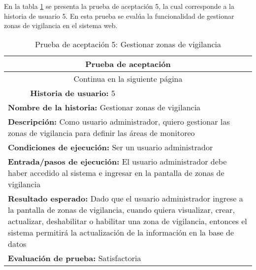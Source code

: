 En la tabla \ref{tab:prueba-5} se presenta la prueba de aceptación 5, la cual corresponde a la historia de usuario 5.
En esta prueba se evalúa la funcionalidad de gestionar zonas de vigilancia en el sistema web.

\begin{longtable}{|p{6.7cm}|p{6.7cm}|}
    \caption{Prueba de aceptación 5: Gestionar zonas de vigilancia} \label{tab:prueba-5}
    \\
    \hline
    \multicolumn{2}{|c|}{\textbf{Prueba de aceptación}}                                                                                                                         \\
    \hline

    \endfirsthead

    \hline
    \endhead

    \hline
    \multicolumn{2}{|c|}{{Continua en la siguiente página}}                                                                                                                     \\
    \hline
    \endfoot

    \hline
    \endlastfoot
    \multicolumn{1}{|p{6.7cm}|}{\textbf{Número} 5 } & \multicolumn{1}{|p{6.7cm}|}{\textbf{Historia de usuario:} 5}                                                              \\
    \hline
    \multicolumn{2}{|p{13.4cm}|}{\textbf{Nombre de la historia:} Gestionar zonas de vigilancia }                                                                                \\
    \hline
    \multicolumn{2}{|p{13.4cm}|}{\textbf{Descripción:} Como usuario administrador, quiero gestionar las zonas de vigilancia para definir las áreas de monitoreo}                \\
    \hline
    \multicolumn{2}{|p{13.4cm}|}{\textbf{Condiciones de ejecución:} Ser un usuario administrador}                                                                               \\
    \hline
    \multicolumn{2}{|p{13.4cm}|}{\textbf{Entrada/pasos de ejecución:} El usuario administrador debe haber accedido al sistema e ingresar en la pantalla de zonas de vigilancia} \\
    \hline
    \multicolumn{2}{|p{13.4cm}|}{\textbf{Resultado esperado:} Dado que el usuario administrador ingrese a la pantalla de zonas de vigilancia, cuando quiera visualizar, crear,
    actualizar, deshabilitar o habilitar una zona de vigilancia, entonces el sistema permitirá la actualización de la información en la base de datos}                          \\
    \hline
    \multicolumn{2}{|p{13.4cm}|}{\textbf{Evaluación de prueba:} Satisfactoria}                                                                                                  \\
    \hline
\end{longtable}

